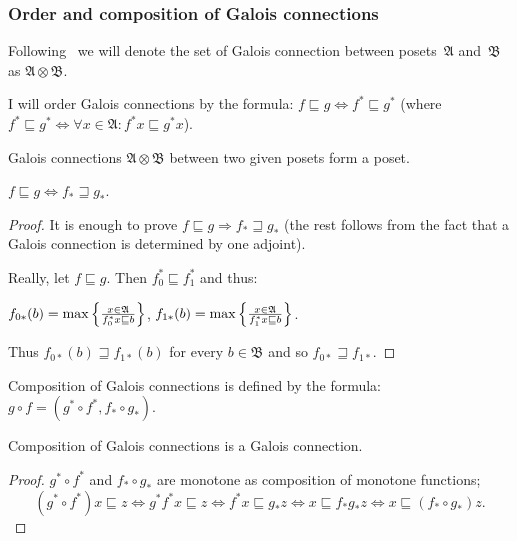 \subsubsection{Order and composition of Galois connections}

Following~\cite{tprod-dist-lat} we will denote the set of Galois connection between posets~$\mathfrak{A}$ and~$\mathfrak{B}$
as $\mathfrak{A}\otimes\mathfrak{B}$.

\begin{defn}
I will order Galois connections by the formula: $f\sqsubseteq g\Leftrightarrow f^{\ast}\sqsubseteq g^{\ast}$
(where $f^{\ast}\sqsubseteq g^{\ast}\Leftrightarrow\forall x\in\mathfrak{A}:f^{\ast}x\sqsubseteq g^{\ast}x$).
\end{defn}

\begin{obvious}
Galois connections $\mathfrak{A}\otimes\mathfrak{B}$ between two given posets form a poset.
\end{obvious}

\begin{prop}
$f\sqsubseteq g\Leftrightarrow f_{\ast}\sqsupseteq g_{\ast}$.
\end{prop}

\begin{proof}
It is enough to prove $f\sqsubseteq g\Rightarrow f_{\ast}\sqsupseteq g_{\ast}$ (the rest follows from the fact that a Galois connection is determined by one adjoint).

Really, let $f\sqsubseteq g$. Then $f_0^{\ast} \sqsubseteq f_1^{\ast}$ and thus:

$f_{0 \ast} (b) = \max \left\{ \frac{ x \in \mathfrak{A} }{
f_0^{\ast} x \sqsubseteq b }\right\}$, $f_{1 \ast} (b) = \max \left\{ \frac{ x \in
\mathfrak{A} }{ f_1^{\ast} x \sqsubseteq b }\right\}$.

Thus $f_{0 \ast} (b) \sqsupseteq f_{1 \ast} (b)$ for every $b\in\mathfrak{B}$ and so $f_{0 \ast} \sqsupseteq f_{1 \ast}$.
\end{proof}

\begin{defn}
Composition of Galois connections is defined by the formula:
$g\circ f=(g^{\ast}\circ f^{\ast},f_{\ast}\circ g_{\ast})$.
\end{defn}

\begin{prop}
Composition of Galois connections is a Galois connection.
\end{prop}

\begin{proof}
$g^{\ast}\circ f^{\ast}$ and $f_{\ast}\circ g_{\ast}$ are monotone as composition of monotone functions;
\[
(g^{\ast}\circ f^{\ast})x\sqsubseteq z \Leftrightarrow g^{\ast}f^{\ast}x\sqsubseteq z \Leftrightarrow
f^{\ast}x\sqsubseteq g_{\ast} z \Leftrightarrow x\sqsubseteq f_{\ast}g_{\ast} z \Leftrightarrow x\sqsubseteq(f_{\ast}\circ g_{\ast})z.
\]
\end{proof}

